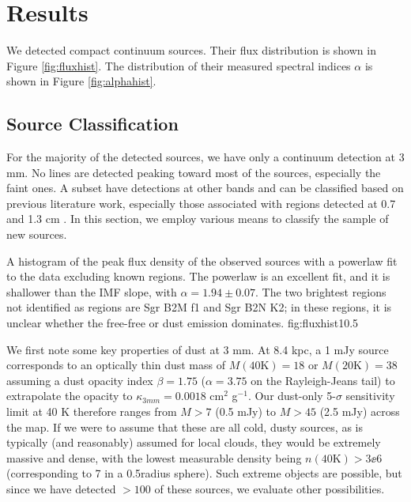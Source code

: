 \documentclass[twocolumn]{aastex61}
\begin{document}
\section{Results}

We detected \ncores compact continuum sources.  Their flux distribution is
shown in Figure \ref{fig:fluxhist}.  The distribution of their measured
spectral indices $\alpha$ is shown in Figure \ref{fig:alphahist}.


\subsection{Source Classification}
\label{sec:classification}
For the majority of the detected sources, we have only a continuum detection at
3 mm.  No lines are detected peaking toward most of the sources, especially the
faint ones.  A subset have detections at other bands and can be classified
based on previous literature work, especially those associated with \hii
regions detected at 0.7 and 1.3 cm
\citep{Gaume1995a,Mehringer1995b,de-Pree1996a,Pree2015a}.  In this section, we
employ various means to classify the sample of new sources.

{A histogram of the peak flux density of the observed sources with a powerlaw
fit to the data excluding known \hii regions.  The powerlaw is an excellent
fit, and it is shallower than the IMF slope, with $\alpha=1.94\pm0.07$.  The
two brightest regions not identified as \hii regions are Sgr B2M f1 and Sgr B2N
K2; in these regions, it is unclear whether the free-free or dust emission
dominates.}
{fig:fluxhist}{1}{0.5\textwidth}

We first note some key properties of dust at 3 mm.   At 8.4 kpc, a 1 mJy source
corresponds to an optically thin dust mass of $M(40\mathrm{K})=18$ \msun or
$M(20\mathrm{K})=38$ \msun assuming a dust opacity index $\beta=1.75$
($\alpha=3.75$ on the Rayleigh-Jeans tail) to
extrapolate the \citet{Ossenkopf1994a} opacity to $\kappa_{3mm}=0.0018$ cm$^2$
g$^{-1}$.  Our dust-only 5-$\sigma$ sensitivity limit at 40 K therefore ranges
from $M>7$ \msun (0.5 mJy) to $M>45$ \msun (2.5 mJy) across the map.  If we
were to assume that these are all cold, dusty sources, as is typically (and
reasonably) assumed for local clouds, they would be extremely massive and
dense, with the lowest measurable density being $n(40\mathrm{K}) > 3\ee{6}$
\percc (corresponding to 7 \msun in a 0.5\arcsec radius sphere).  Such extreme
objects are possible, but since we have detected $>100$ of these sources, we
evaluate other possibilities.
\end{document}
